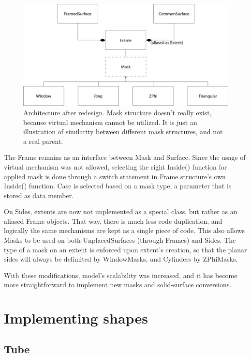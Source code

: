 \documentclass[12pt, a4paper]{article}
\begin{document}
\begin{figure}[h]
	\includegraphics[width=\textwidth]{Figures/diagram_old.png}
	\caption{Architecture after redesign. Mask structure doesn't really exist, because virtual mechanism cannot be utilized. It is just an illustration of similarity between different mask structures, and not a real parent.}
\end{figure}

The Frame remains as an interface between Mask and Surface. Since the usage of virtual mechanism was not allowed, selecting the right {\selectfont Inside()} function for applied mask is done through a switch statement in Frame structure's own {\selectfont Inside()} function. Case is selected based on a mask type, a parameter that is stored as data member.

On Sides, extents are now not implemented as a special class, but rather as an aliased Frame objects. That way, there is much less code duplication, and logically the same mechanisms are kept as a single piece of code. This also allows Masks to be used on both UnplacedSurfaces (through Frames) and Sides. The type of a mask on an extent is enforced upon extent's creation, so that the planar sides will always be delimited by WindowMasks, and Cylinders by ZPhiMasks.

With these modifications, model's scalability was increased, and it has become more straightforward to implement new masks and solid-surface conversions.


\section{Implementing shapes}

\subsection{Tube}
\end{document}
